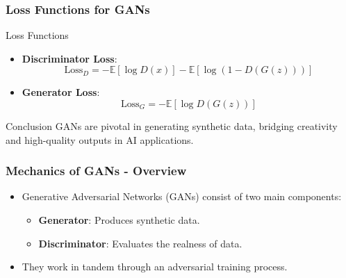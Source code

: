 \documentclass[aspectratio=169]{beamer}
\begin{document}
\begin{frame}[fragile]
    \frametitle{Loss Functions for GANs}
    \begin{block}{Loss Functions}
        \begin{itemize}
            \item \textbf{Discriminator Loss}:
            \[
            \text{Loss}_D = -\mathbb{E}[\log D(x)] - \mathbb{E}[\log(1 - D(G(z)))]
            \]
            \item \textbf{Generator Loss}:
            \[
            \text{Loss}_G = -\mathbb{E}[\log D(G(z))]
            \]
        \end{itemize}
    \end{block}

    \begin{block}{Conclusion}
        GANs are pivotal in generating synthetic data, bridging creativity and high-quality outputs in AI applications.
    \end{block}
\end{frame}

\begin{frame}[fragile]
    \frametitle{Mechanics of GANs - Overview}
    \begin{itemize}
        \item Generative Adversarial Networks (GANs) consist of two main components: 
        \begin{itemize}
            \item \textbf{Generator}: Produces synthetic data.
            \item \textbf{Discriminator}: Evaluates the realness of data.
        \end{itemize}
        \item They work in tandem through an adversarial training process.
    \end{itemize}
\end{frame}
\end{document}
